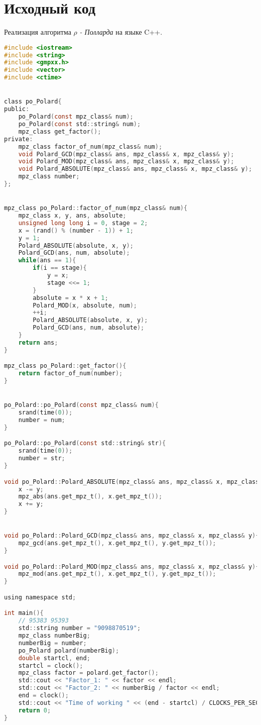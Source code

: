 \documentclass[pdf, unicode, 12pt, a4paper,oneside,fleqn]{article}
\begin{document}
\pagebreak

\section{Исходный код}

Реализация алгоритма $\rho${ \it- Полларда} на языке C++.\newline

\begin{lstlisting}[language=C]
#include <iostream>
#include <string>
#include <gmpxx.h>
#include <vector>
#include <ctime>


class po_Polard{
public:
    po_Polard(const mpz_class& num);
    po_Polard(const std::string& num);
    mpz_class get_factor();
private:
    mpz_class factor_of_num(mpz_class& num);
    void Polard_GCD(mpz_class& ans, mpz_class& x, mpz_class& y);
    void Polard_MOD(mpz_class& ans, mpz_class& x, mpz_class& y);
    void Polard_ABSOLUTE(mpz_class& ans, mpz_class& x, mpz_class& y);
    mpz_class number;
};


mpz_class po_Polard::factor_of_num(mpz_class& num){
    mpz_class x, y, ans, absolute;
    unsigned long long i = 0, stage = 2;
    x = (rand() % (number - 1)) + 1;
    y = 1;
    Polard_ABSOLUTE(absolute, x, y);
    Polard_GCD(ans, num, absolute);
    while(ans == 1){
        if(i == stage){
            y = x;
            stage <<= 1;
        }
        absolute = x * x + 1;
        Polard_MOD(x, absolute, num);
        ++i;
        Polard_ABSOLUTE(absolute, x, y);
        Polard_GCD(ans, num, absolute);
    }
    return ans;
}

mpz_class po_Polard::get_factor(){
    return factor_of_num(number);
}


po_Polard::po_Polard(const mpz_class& num){
    srand(time(0));
    number = num;
}

po_Polard::po_Polard(const std::string& str){
    srand(time(0));
    number = str;
}

void po_Polard::Polard_ABSOLUTE(mpz_class& ans, mpz_class& x, mpz_class& y){
    x -= y;
    mpz_abs(ans.get_mpz_t(), x.get_mpz_t());
    x += y;
}


void po_Polard::Polard_GCD(mpz_class& ans, mpz_class& x, mpz_class& y){
    mpz_gcd(ans.get_mpz_t(), x.get_mpz_t(), y.get_mpz_t());
}

void po_Polard::Polard_MOD(mpz_class& ans, mpz_class& x, mpz_class& y){
    mpz_mod(ans.get_mpz_t(), x.get_mpz_t(), y.get_mpz_t());
}

using namespace std;

int main(){
    // 95383 95393 
    std::string number = "9098870519";
    mpz_class numberBig;
    numberBig = number; 
    po_Polard polard(numberBig);
    double startcl, end;
    startcl = clock();
    mpz_class factor = polard.get_factor();
    std::cout << "Factor_1: " << factor << endl;
    std::cout << "Factor_2: " << numberBig / factor << endl;
    end = clock();
    std::cout << "Time of working " << (end - startcl) / CLOCKS_PER_SEC << "sec" << std::endl;
    return 0;
}
\end{lstlisting}
\end{document}
